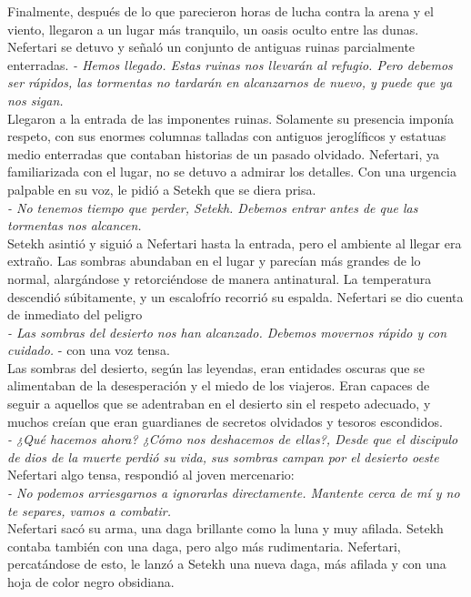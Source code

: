 Finalmente, después de lo que parecieron horas de lucha contra la arena y el viento, llegaron a un lugar más tranquilo, un oasis oculto entre las dunas. Nefertari se detuvo y señaló un conjunto de antiguas ruinas parcialmente enterradas.
\textit{- Hemos llegado. Estas ruinas nos llevarán al refugio. Pero debemos ser rápidos, las tormentas no tardarán en alcanzarnos de nuevo, y puede que ya nos sigan.} \\
Llegaron a la entrada de las imponentes ruinas. Solamente su presencia imponía respeto, con sus enormes columnas talladas con antiguos jeroglíficos y estatuas medio enterradas que contaban historias de un pasado olvidado. Nefertari, ya familiarizada con el lugar, no se detuvo a admirar los detalles. Con una urgencia palpable en su voz, le pidió a Setekh que se diera prisa.\\
\textit{- No tenemos tiempo que perder, Setekh. Debemos entrar antes de que las tormentas nos alcancen.}\\
Setekh asintió y siguió a Nefertari hasta la entrada, pero el ambiente al llegar era extraño. Las sombras abundaban en el lugar y parecían más grandes de lo normal, alargándose y retorciéndose de manera antinatural. La temperatura descendió súbitamente, y un escalofrío recorrió su espalda. Nefertari se dio cuenta de inmediato del peligro\\
\textit{- Las sombras del desierto nos han alcanzado. Debemos movernos rápido y con cuidado.} - con una voz tensa.\\
Las sombras del desierto, según las leyendas, eran entidades oscuras que se alimentaban de la desesperación y el miedo de los viajeros. Eran capaces de seguir a aquellos que se adentraban en el desierto sin el respeto adecuado, y muchos creían que eran guardianes de secretos olvidados y tesoros escondidos.\\
\textit{- ¿Qué hacemos ahora? ¿Cómo nos deshacemos de ellas?, Desde que el discipulo de dios de la muerte perdió su vida, sus sombras campan por el desierto oeste}\\
Nefertari algo tensa, respondió al joven mercenario:\\
\textit{- No podemos arriesgarnos a ignorarlas directamente. Mantente cerca de mí y no te separes, vamos a combatir.}\\
Nefertari sacó su arma, una daga brillante como la luna y muy afilada. Setekh contaba también con una daga, pero algo más rudimentaria. Nefertari, percatándose de esto, le lanzó a Setekh una nueva daga, más afilada y con una hoja de color negro obsidiana.
